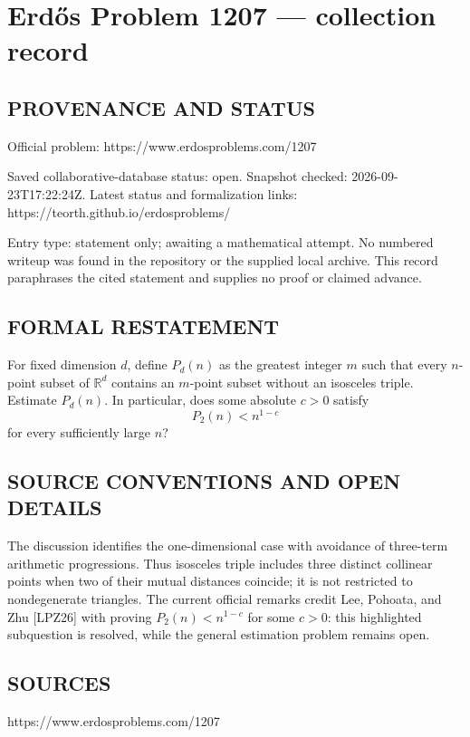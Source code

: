 \section*{Erd\H{o}s Problem 1207 --- collection record}

\subsection*{PROVENANCE AND STATUS}
Official problem: https://www.erdosproblems.com/1207

Saved collaborative-database status: open.
Snapshot checked: 2026-09-23T17:22:24Z.
Latest status and formalization links: https://teorth.github.io/erdosproblems/

Entry type: statement only; awaiting a mathematical attempt. No numbered writeup was found in the repository or the supplied local archive. This record paraphrases the cited statement and supplies no proof or claimed advance.

\subsection*{FORMAL RESTATEMENT}
For fixed dimension $d$, define $P_d(n)$ as the greatest integer $m$ such that every $n$-point subset of $\mathbb R^d$ contains an $m$-point subset without an isosceles triple. Estimate $P_d(n)$. In particular, does some absolute $c>0$ satisfy
\[P_2(n)<n^{1-c}\]
for every sufficiently large $n$?

\subsection*{SOURCE CONVENTIONS AND OPEN DETAILS}
The discussion identifies the one-dimensional case with avoidance of three-term arithmetic progressions. Thus isosceles triple includes three distinct collinear points when two of their mutual distances coincide; it is not restricted to nondegenerate triangles. The current official remarks credit Lee, Pohoata, and Zhu [LPZ26] with proving $P_2(n)<n^{1-c}$ for some $c>0$: this highlighted subquestion is resolved, while the general estimation problem remains open.

\subsection*{SOURCES}
https://www.erdosproblems.com/1207

